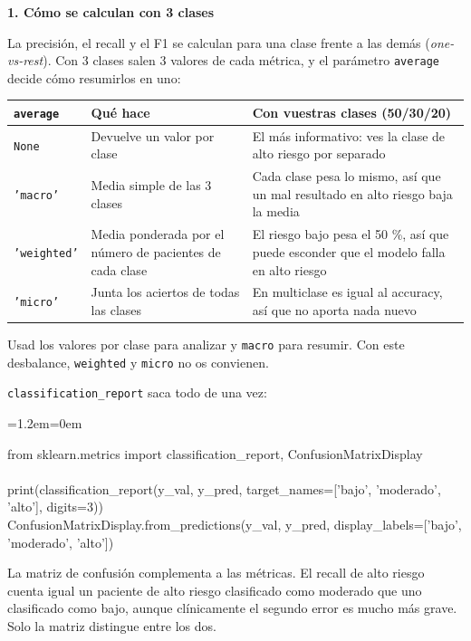 \documentclass[11pt,a4paper]{article}
\newenvironment{codigo}
  {\par\smallskip\begin{list}{}{\leftmargin=1.2em\rightmargin=0em}\item\relax\ttfamily\scriptsize\raggedright}
  {\end{list}\smallskip}
\begin{document}
{\small
\textbf{1. Cómo se calculan con 3 clases}

La precisión, el recall y el F1 se calculan para una clase frente a las demás (\textit{one-vs-rest}). Con 3 clases salen 3 valores de cada métrica, y el parámetro \texttt{average} decide cómo resumirlos en uno:

{\footnotesize\noindent\begin{tabularx}{\linewidth}{>{\raggedright\arraybackslash}X>{\raggedright\arraybackslash}X>{\raggedright\arraybackslash}X}
\toprule
\textbf{\texttt{average}} & \textbf{Qué hace} & \textbf{Con vuestras clases (50/\allowbreak{}30/\allowbreak{}20)} \\
\midrule
\texttt{None} & Devuelve un valor por clase & El más informativo: ves la clase de alto riesgo por separado \\
\texttt{'macro'} & Media simple de las 3 clases & Cada clase pesa lo mismo, así que un mal resultado en alto riesgo baja la media \\
\texttt{'weighted'} & Media ponderada por el número de pacientes de cada clase & El riesgo bajo pesa el 50 \%, así que puede esconder que el modelo falla en alto riesgo \\
\texttt{'micro'} & Junta los aciertos de todas las clases & En multiclase es igual al accuracy, así que no aporta nada nuevo \\
\bottomrule
\end{tabularx}}

Usad los valores por clase para analizar y \texttt{macro} para resumir. Con este desbalance, \texttt{weighted} y \texttt{micro} no os convienen.

\texttt{classification\_\allowbreak{}report} saca todo de una vez:

\begin{codigo}
from sklearn.metrics import classification\_\allowbreak{}report, ConfusionMatrixDisplay \\{}
\mbox{} \\{}
print(classification\_\allowbreak{}report(y\_\allowbreak{}val, y\_\allowbreak{}pred, target\_\allowbreak{}names=['bajo', 'moderado', 'alto'], digits=3)) \\{}
ConfusionMatrixDisplay.from\_\allowbreak{}predictions(y\_\allowbreak{}val, y\_\allowbreak{}pred, display\_\allowbreak{}labels=['bajo', 'moderado', 'alto'])
\end{codigo}
La matriz de confusión complementa a las métricas. El recall de alto riesgo cuenta igual un paciente de alto riesgo clasificado como moderado que uno clasificado como bajo, aunque clínicamente el segundo error es mucho más grave. Solo la matriz distingue entre los dos.

}
\end{document}
